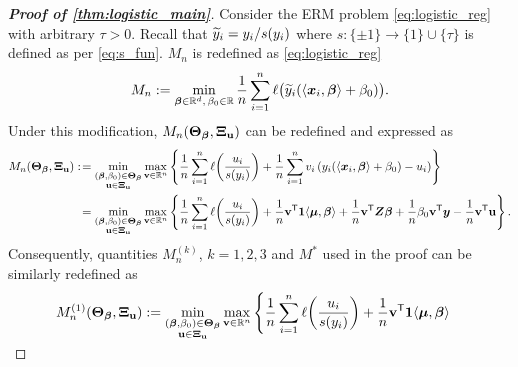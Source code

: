 \begin{proof}[\textbf{Proof of \cref{thm:logistic_main}}]
    Consider the ERM problem \cref{eq:logistic_reg} with arbitrary $\tau > 0$. Recall that $\widetilde y_i = y_i/s(y_i)$ where $s: \{ \pm 1 \} \to \{ 1 \} \cup \{ \tau \}$ is defined as per \cref{eq:s_fun}. $M_n$ is redefined as \cref{eq:logistic_reg}
    \begin{equation*}
        M_n := \min_{\text{\boldmath $\beta$} \in \mathbb{R}^d, \, \beta_0 \in \mathbb{R}}  \frac1n \sum_{i=1}^n \ell\bigl( 
        \widetilde y_i(\langle \text{\boldmath $x$}_i, \text{\boldmath $\beta$} \rangle +  \beta_0 )
        \bigr).
    \end{equation*}
    Under this modification, $M_n(\text{\boldmath $\Theta$}_{{\boldsymbol{\beta}}}, \text{\boldmath $\Xi$}_{\mathrm{\bf u}})$ can be redefined and expressed as
    \begin{align*}
        M_n(\text{\boldmath $\Theta$}_{{\boldsymbol{\beta}}}, \text{\boldmath $\Xi$}_{\mathrm{\bf u}})
        :\! & = \min_{ \substack{ (\text{\boldmath $\beta$} , \beta_0) \in \text{\boldmath $\Theta$}_{{\boldsymbol{\beta}}} \\  \mathrm{\bf u} \in \text{\boldmath $\Xi$}_{\mathrm{\bf u}} } }
        \max_{ \mathrm{\bf v} \in \mathbb{R}^n } \left\{
        \frac1n \sum_{i=1}^n \ell \biggl( \frac{u_i}{s(y_i)} \biggr)
         + \frac{1}{n} \sum_{i=1}^n v_i \left( y_i(\langle \text{\boldmath $x$}_i, \text{\boldmath $\beta$} \rangle +  \beta_0 ) - u_i \right)
         \right\} \\
        & = \min_{ \substack{ (\text{\boldmath $\beta$} , \beta_0) \in \text{\boldmath $\Theta$}_{{\boldsymbol{\beta}}} \\  \mathrm{\bf u} \in \text{\boldmath $\Xi$}_{\mathrm{\bf u}} } }
     \max_{ \mathrm{\bf v} \in \mathbb{R}^n }
     \left\{
     \frac1n \sum_{i=1}^n \ell \biggl( \frac{u_i}{s(y_i)} \biggr)
      + \frac1n \mathrm{\bf v}^{\sf T} \mathrm{\bf 1} \langle \text{\boldmath $\mu$}, {\boldsymbol{\beta}} \rangle
      + \frac1n \mathrm{\bf v}^{\sf T} \text{\boldmath $Z$} {\boldsymbol{\beta}} + \frac1n \beta_0 \mathrm{\bf v}^{\sf T} \text{\boldmath $y$} - \frac1n \mathrm{\bf v}^{\sf T} \mathrm{\bf u}
      \right\}.
    \end{align*}
Consequently, quantities $M_n^{(k)}$, $k= 1,2,3$ and $M^*$ used in the proof can be similarly redefined as
    \begin{align*}
        M_n^{(1)}(\bTheta_{\vbeta}, \bXi_{\bu})
        & : = \smash {\min_{ \substack{ (\bbeta , \beta_0) \in \bTheta_{\vbeta} \\  \bu \in \bXi_{\bu} } } }
        \max_{ \bv \in \R^n }
        \, \Biggl\{
        \frac1n \sum_{i=1}^n \ell \biggl( \frac{u_i}{s(y_i)} \biggr)
         + \frac1n \bv^\top \bone \< \bmu, \vbeta \>

\end{align*}
\end{proof}
